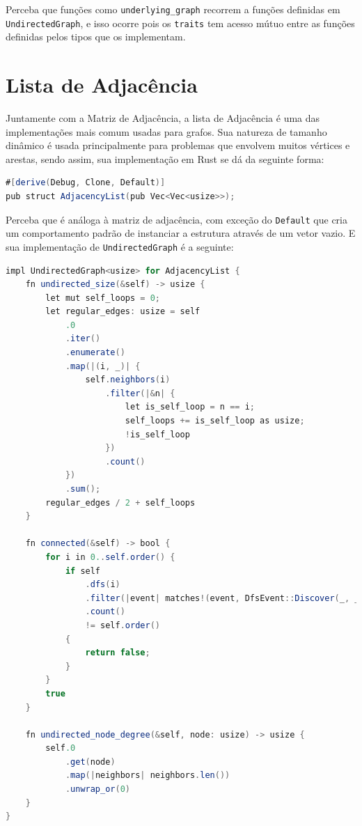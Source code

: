 Perceba que funções como \texttt{underlying_graph} recorrem a funções definidas em \texttt{UndirectedGraph}, e isso ocorre pois os \texttt{traits} tem acesso mútuo entre as funções definidas pelos tipos que os implementam.

\section{Lista de Adjacência}

Juntamente com a Matriz de Adjacência, a lista de Adjacência é uma das implementações mais comum usadas para grafos. Sua natureza de tamanho dinâmico é usada principalmente para problemas que envolvem muitos vértices e arestas, sendo assim, sua implementação em Rust se dá da seguinte forma:

\begin{lstlisting}[language=Java, caption={Implementação de Graph na Estrutura de Dados Matriz de Adjacência}, label=list:impl_adj_mat_g]
#[derive(Debug, Clone, Default)]
pub struct AdjacencyList(pub Vec<Vec<usize>>);
\end{lstlisting}

Perceba que é análoga à matriz de adjacência, com exceção do \texttt{Default} que cria um comportamento padrão de instanciar a estrutura através de um vetor vazio. E sua implementação de \texttt{UndirectedGraph} é a seguinte:

\begin{lstlisting}[language=Java, caption={Implementação de Graph na Estrutura de Dados Matriz de Adjacência}, label=list:impl_adj_mat_g]
impl UndirectedGraph<usize> for AdjacencyList {
    fn undirected_size(&self) -> usize {
        let mut self_loops = 0;
        let regular_edges: usize = self
            .0
            .iter()
            .enumerate()
            .map(|(i, _)| {
                self.neighbors(i)
                    .filter(|&n| {
                        let is_self_loop = n == i;
                        self_loops += is_self_loop as usize;
                        !is_self_loop
                    })
                    .count()
            })
            .sum();
        regular_edges / 2 + self_loops
    }

    fn connected(&self) -> bool {
        for i in 0..self.order() {
            if self
                .dfs(i)
                .filter(|event| matches!(event, DfsEvent::Discover(_, _)))
                .count()
                != self.order()
            {
                return false;
            }
        }
        true
    }

    fn undirected_node_degree(&self, node: usize) -> usize {
        self.0
            .get(node)
            .map(|neighbors| neighbors.len())
            .unwrap_or(0)
    }
}
\end{lstlisting}

